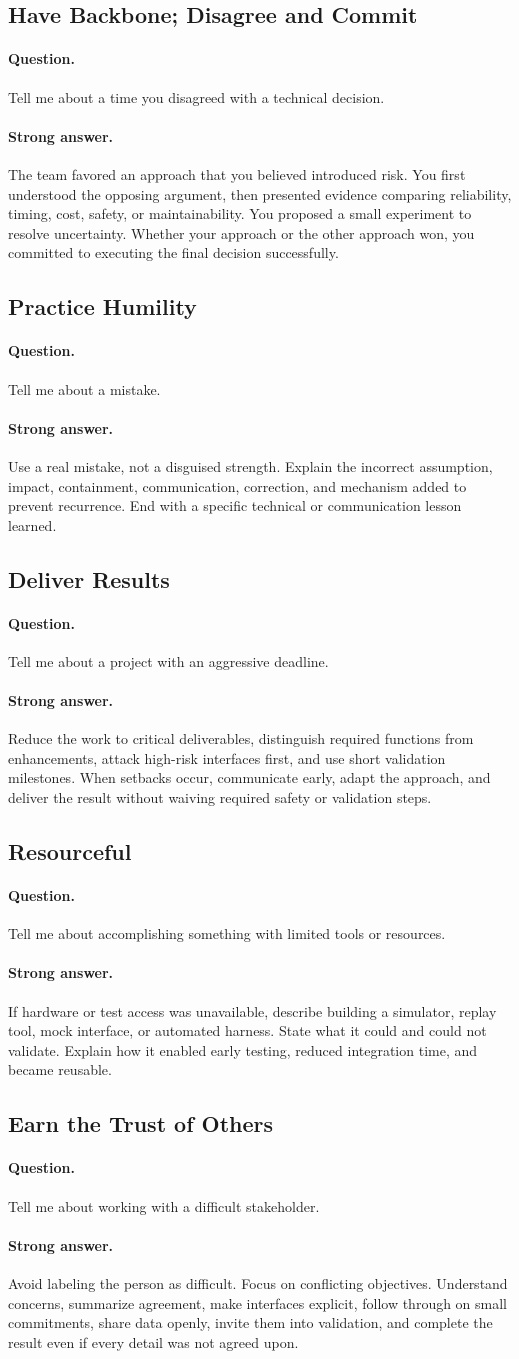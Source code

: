 \documentclass[11pt]{article}
\newcommand{\q}[1]{\paragraph{Question.} #1}
\newcommand{\ans}[1]{\paragraph{Strong answer.} #1}
\begin{document}
\subsection{Have Backbone; Disagree and Commit}
\q{Tell me about a time you disagreed with a technical decision.}
\ans{The team favored an approach that you believed introduced risk. You first
understood the opposing argument, then presented evidence comparing reliability,
timing, cost, safety, or maintainability. You proposed a small experiment to
resolve uncertainty. Whether your approach or the other approach won, you
committed to executing the final decision successfully.}

\subsection{Practice Humility}
\q{Tell me about a mistake.}
\ans{Use a real mistake, not a disguised strength. Explain the incorrect assumption,
impact, containment, communication, correction, and mechanism added to prevent
recurrence. End with a specific technical or communication lesson learned.}

\subsection{Deliver Results}
\q{Tell me about a project with an aggressive deadline.}
\ans{Reduce the work to critical deliverables, distinguish required functions from
enhancements, attack high-risk interfaces first, and use short validation
milestones. When setbacks occur, communicate early, adapt the approach, and
deliver the result without waiving required safety or validation steps.}

\subsection{Resourceful}
\q{Tell me about accomplishing something with limited tools or resources.}
\ans{If hardware or test access was unavailable, describe building a simulator,
replay tool, mock interface, or automated harness. State what it could and could
not validate. Explain how it enabled early testing, reduced integration time, and
became reusable.}

\subsection{Earn the Trust of Others}
\q{Tell me about working with a difficult stakeholder.}
\ans{Avoid labeling the person as difficult. Focus on conflicting objectives.
Understand concerns, summarize agreement, make interfaces explicit, follow
through on small commitments, share data openly, invite them into validation,
and complete the result even if every detail was not agreed upon.}
\end{document}
